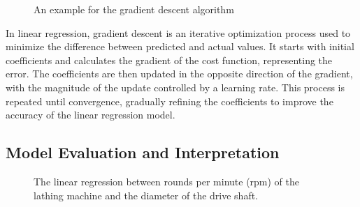 \documentclass[
  a4paper,
]{scrbook}
\begin{document}
\begin{figure}[ht]


\caption{\label{fig-grad-desc}An example for the gradient descent
algorithm}

\end{figure}%

In linear regression, gradient descent is an iterative optimization
process used to minimize the difference between predicted and actual
values. It starts with initial coefficients and calculates the gradient
of the cost function, representing the error. The coefficients are then
updated in the opposite direction of the gradient, with the magnitude of
the update controlled by a learning rate. This process is repeated until
convergence, gradually refining the coefficients to improve the accuracy
of the linear regression model.

\subsection{Model Evaluation and
Interpretation}\label{model-evaluation-and-interpretation}

\begin{figure}[H]


\caption{\label{fig-lm}The linear regression between rounds per minute
(rpm) of the lathing machine and the diameter of the drive shaft.}

\end{figure}%
\end{document}
